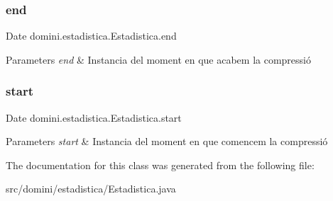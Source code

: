 \subsubsection{\texorpdfstring{end}{end}}
{\footnotesize\ttfamily Date domini.\+estadistica.\+Estadistica.\+end\hspace{0.3cm}{\ttfamily [package]}}


\begin{DoxyParams}{Parameters}
{\em end} & Instancia del moment en que acabem la compressió \\
\hline
\end{DoxyParams}
\mbox{\label{classdomini_1_1estadistica_1_1Estadistica_aee0ae604272563ceab4e61392cbd343e}} 
\subsubsection{\texorpdfstring{start}{start}}
{\footnotesize\ttfamily Date domini.\+estadistica.\+Estadistica.\+start\hspace{0.3cm}{\ttfamily [package]}}


\begin{DoxyParams}{Parameters}
{\em start} & Instancia del moment en que comencem la compressió \\
\hline
\end{DoxyParams}


The documentation for this class was generated from the following file\+:\begin{DoxyCompactItemize}
\item 
src/domini/estadistica/Estadistica.\+java\end{DoxyCompactItemize}
